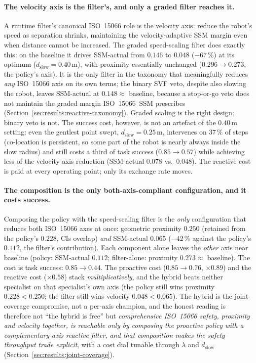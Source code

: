 \documentclass[11pt,a4paper]{report}
\newcommand{\ssm}{SSM}
\newcommand{\iso}{ISO~15066}
\begin{document}
\paragraph{The velocity axis is the filter's, and only a graded filter
reaches it.}
A runtime filter's canonical \iso{} role is the velocity axis: reduce
the robot's speed as separation shrinks, maintaining the
velocity-adaptive \ssm{} margin even when distance cannot be increased.
The graded speed-scaling filter does exactly this: on the baseline it
drives \ssm{}-actual from $0.146$ to $0.048$ ($-67\,\%$) at its optimum
($d_{\mathrm{slow}} = 0.40$\,m), with proximity essentially unchanged
($0.296 \rightarrow 0.273$, the policy's axis). It is the only filter
in the taxonomy that meaningfully reduces \emph{any} \iso{} axis on its
own terms; the binary SVF veto, despite also slowing the robot, leaves
\ssm{}-actual at $0.148 \approx$ baseline, because a stop-or-go veto
does not maintain the graded margin \iso{}~\ssm{} prescribes
(Section~\ref{sec:results:reactive-taxonomy}). Graded scaling is the
right design; binary veto is not. The success cost, however, is not an
artefact of the $0.40$\,m setting: even the gentlest point swept,
$d_{\mathrm{slow}} = 0.25$\,m, intervenes on $37\,\%$ of steps
(co-location is persistent, so some part of the robot is nearly always
inside the slow radius) and still costs a third of task success
($0.85 \rightarrow 0.57$) while achieving less of the velocity-axis
reduction (\ssm{}-actual $0.078$ vs.\ $0.048$). The reactive cost is
paid at every operating point; only its exchange rate moves.

\paragraph{The composition is the only both-axis-compliant
configuration, and it costs success.}
Composing the policy with the speed-scaling filter is the \emph{only}
configuration that reduces both \iso{} axes at once: geometric
proximity $0.250$ (retained from the policy's $0.228$, CIs overlap)
\emph{and} \ssm{}-actual $0.065$ ($-42\,\%$ against the policy's
$0.112$, the filter's contribution). Each component alone leaves the
\emph{other} axis near baseline (policy: \ssm{}-actual $0.112$;
filter-alone: proximity $0.273 \approx$ baseline). The cost is task
success: $0.85 \rightarrow 0.44$. The proactive cost ($0.85 \to 0.76$,
$\times 0.89$) and the reactive cost ($\times 0.58$) stack
\emph{multiplicatively}, and the hybrid beats neither specialist on
that specialist's own axis (the policy still wins proximity
$0.228 < 0.250$; the filter still wins velocity $0.048 < 0.065$). The
hybrid is the joint-coverage compromise, not a per-axis champion, and
the honest reading is therefore not ``the hybrid is free'' but
\emph{comprehensive \iso{} safety, proximity and velocity together, is
reachable only by composing the proactive policy with a
complementary-axis reactive filter, and that composition makes the
safety--throughput trade explicit}, with a cost dial tunable through
$\lambda$ and $d_{\mathrm{slow}}$
(Section~\ref{sec:results:joint-coverage}).
\end{document}
